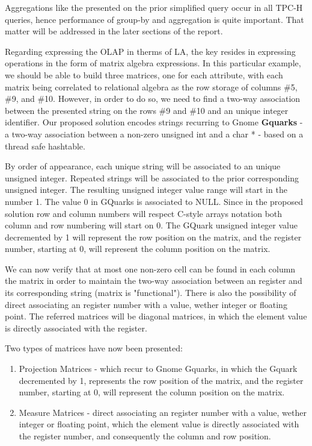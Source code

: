 Aggregations like the presented on the prior simplified query occur in all TPC-H queries, hence performance of group-by and aggregation is quite important. That matter will be addressed in the later sections of the report.\par 
Regarding expressing the OLAP  in therms of LA, the key resides in expressing operations in the form of matrix algebra expressions.  In this particular example, we should be able to build three matrices, one for each attribute, with each matrix being correlated to relational algebra as the row storage of columns \#5, \#9, and \#10. However, in order to do so, we need to find a two-way association between the presented string on the rows \#9 and \#10 and an unique integer identifier. Our proposed solution encodes strings recurring to Gnome \textbf{Gquarks} - a two-way association between a non-zero unsigned int and a char * - based on a thread safe hashtable. \par 
By order of appearance, each unique string will be associated to an unique unsigned integer. Repeated strings will be associated to the prior corresponding unsigned integer. The resulting unsigned integer value range will start in the number 1. The value 0 in GQuarks is associated to NULL. Since in the proposed solution row and column numbers will respect  C-style arrays notation both column and row numbering will start on 0. The GQuark unsigned integer value decremented by 1  will represent the row position on the matrix, and the register number, starting at 0, will represent the column position on the matrix. \par 
We can now verify that at most one non-zero cell can be found in each column the matrix in order to maintain the two-way association between an register and its corresponding string (matrix is "functional"). There is also the possibility of direct associating an register number with a value, wether integer or floating point. The referred matrices will be diagonal matrices, in which the element value is directly associated with the register.\par 
Two types of matrices have now been presented:
\label{definition_matrices}
\begin{enumerate}
\item Projection Matrices - which recur to Gnome Gquarks, in which the Gquark decremented by 1, represents the row position of the matrix, and the register number, starting at 0, will represent the column position on the matrix.
\item Measure Matrices -  direct associating an register number with a value, wether integer or floating point,  which the element value is directly associated with the register number, and consequently the column and row position.
\end{enumerate}
 
